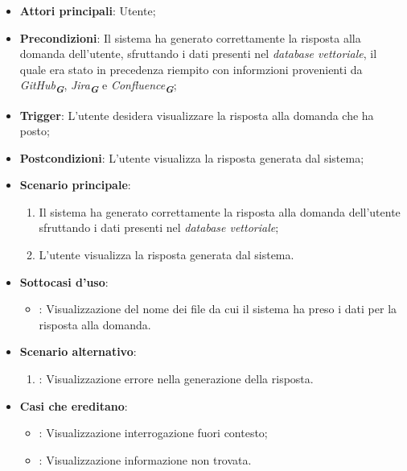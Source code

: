 \begin{itemize}
    \item \textbf{Attori principali}: Utente;
    \item \textbf{Precondizioni}: Il sistema ha generato correttamente la risposta alla domanda dell'utente, sfruttando i dati
    presenti nel \emph{database vettoriale}, il quale era stato in precedenza riempito con informzioni provenienti da \emph{GitHub}\textsubscript{\textbf{\textit{G}}}, 
    \emph{Jira}\textsubscript{\textbf{\textit{G}}} e \emph{Confluence}\textsubscript{\textbf{\textit{G}}};
    \item \textbf{Trigger}: L'utente desidera visualizzare la risposta alla domanda che ha posto;
    \item \textbf{Postcondizioni}: L'utente visualizza la risposta generata dal sistema;
    \item \textbf{Scenario principale}:
    \begin{enumerate}
        \item Il sistema ha generato correttamente la risposta alla domanda dell'utente sfruttando i dati presenti nel \emph{database vettoriale};
        \item L'utente visualizza la risposta generata dal sistema.
    \end{enumerate}
    \item \textbf{Sottocasi d'uso}:
    \begin{itemize}
        \item {}: Visualizzazione del nome dei file da cui il sistema ha preso i dati per la risposta alla domanda.
    \end{itemize}
    \item \textbf{Scenario alternativo}:
    \begin{enumerate}
        \item {}: Visualizzazione errore nella generazione della risposta.
    \end{enumerate}
    \item \textbf{Casi che ereditano}:
    \begin{itemize}
        \item {}: Visualizzazione interrogazione fuori contesto;
        \item {}: Visualizzazione informazione non trovata.
    \end{itemize}
\end{itemize}

